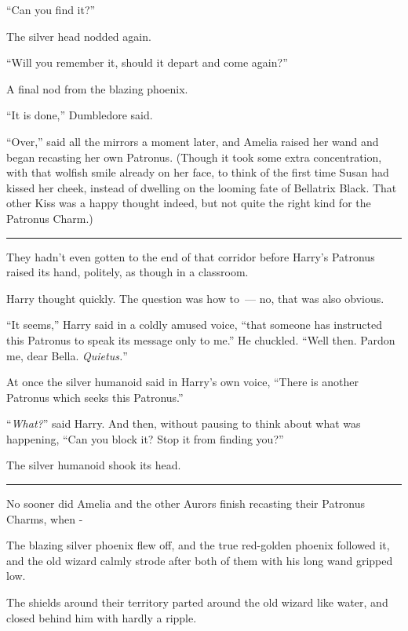 ``Can you find it?''

The silver head nodded again.

``Will you remember it, should it depart and come again?''

A final nod from the blazing phoenix.

``It is done,'' Dumbledore said.

``Over,'' said all the mirrors a moment later, and Amelia raised her wand and began recasting her own Patronus. (Though it took some extra concentration, with that wolfish smile already on her face, to think of the first time Susan had kissed her cheek, instead of dwelling on the looming fate of Bellatrix Black. That other Kiss was a happy thought indeed, but not quite the right kind for the Patronus Charm.)

\begin{center}\rule{3in}{0.4pt}\end{center}

They hadn't even gotten to the end of that corridor before Harry's Patronus raised its hand, politely, as though in a classroom.

Harry thought quickly. The question was how to~--- no, that was also obvious.

``It seems,'' Harry said in a coldly amused voice, ``that someone has instructed this Patronus to speak its message only to me.'' He chuckled. ``Well then. Pardon me, dear Bella. \emph{Quietus.}''

At once the silver humanoid said in Harry's own voice, ``There is another Patronus which seeks this Patronus.''

``\emph{What?}'' said Harry. And then, without pausing to think about what was happening, ``Can you block it? Stop it from finding you?''

The silver humanoid shook its head.

\begin{center}\rule{3in}{0.4pt}\end{center}

No sooner did Amelia and the other Aurors finish recasting their Patronus Charms, when -

The blazing silver phoenix flew off, and the true red-golden phoenix followed it, and the old wizard calmly strode after both of them with his long wand gripped low.

The shields around their territory parted around the old wizard like water, and closed behind him with hardly a ripple.

